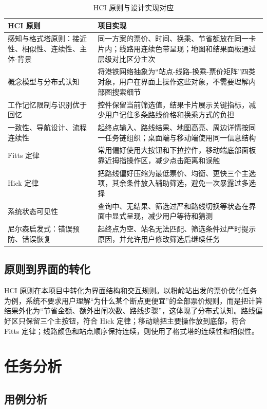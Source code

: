 \documentclass[UTF8,a4paper,11pt]{ctexart}
\begin{document}
\begin{table}[H]
  \centering
  \caption{HCI 原则与设计实现对应}
  \begin{tabularx}{\textwidth}{p{}Y}
    \toprule
    HCI 原则 & 项目实现 \\
    \midrule
    感知与格式塔原则：接近性、相似性、连续性、主体-背景 & 同一方案的票价、时间、换乘、节省额放在同一卡片内；线路用连续色带呈现；地图和结果面板通过层级对比区分主次 \\
    概念模型与分布式认知 & 将港铁网络抽象为“站点-线路-换乘-票价矩阵”四类对象，用户在界面上操作这些对象，不需要理解内部图搜索细节 \\
    工作记忆限制与识别优于回忆 & 控件保留当前筛选值，结果卡片展示关键指标，减少用户记住多条路线价格和换乘方式的负担 \\
    一致性、导航设计、流程连续性 & 起终点输入、路线结果、地图高亮、周边详情按同一任务链组织；桌面端与移动端使用同一信息结构 \\
    Fitts 定律 & 常用偏好使用大按钮和下拉控件，移动端底部面板靠近拇指操作区，减少点击距离和误触 \\
    Hick 定律 & 把路线偏好压缩为最低票价、均衡、更快三个主选项，其余条件放入辅助筛选，避免一次暴露过多选择 \\
    系统状态可见性 & 查询中、无结果、筛选过严和路线切换等状态在界面中显式呈现，减少用户等待和猜测 \\
    尼尔森启发式：错误预防、错误恢复 & 起终点为空、站名无法匹配、筛选条件过严时提示原因，并允许用户修改筛选后继续任务 \\
    \bottomrule
  \end{tabularx}
\end{table}

\subsection{原则到界面的转化}

HCI 原则在本项目中转化为界面结构和交互规则。以粉岭站出发的票价优化任务为例，系统不要求用户理解“为什么某个断点更便宜”的全部票价规则，而是把计算结果外化为“节省金额、额外出闸次数、路线步骤”，这体现了分布式认知。路线偏好区只保留三个主按钮，符合 Hick 定律；移动端把主要操作放到底部，符合 Fitts 定律；线路颜色和站点顺序保持连续，则使用了格式塔的连续性和相似性。

\section{任务分析}

\subsection{用例分析}
\end{document}
